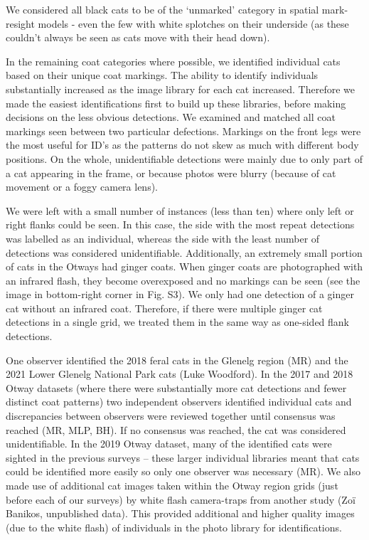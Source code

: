 \documentclass[11pt,a4paper,titlepage,twoside,openright]{style/unimelbthesis}
\begin{document}
\begin{mainmatter}
We considered all black cats to be of the `unmarked' category in spatial mark-resight models - even the few with white splotches on their underside (as these couldn't always be seen as cats move with their head down).

In the remaining coat categories where possible, we identified individual cats based on their unique coat markings. The ability to identify individuals substantially increased as the image library for each cat increased. Therefore we made the easiest identifications first to build up these libraries, before making decisions on the less obvious detections. We examined and matched all coat markings seen between two particular defections. Markings on the front legs were the most useful for ID's as the patterns do not skew as much with different body positions. On the whole, unidentifiable detections were mainly due to only part of a cat appearing in the frame, or because photos were blurry (because of cat movement or a foggy camera lens).

We were left with a small number of instances (less than ten) where only left or right flanks could be seen. In this case, the side with the most repeat detections was labelled as an individual, whereas the side with the least number of detections was considered unidentifiable. Additionally, an extremely small portion of cats in the Otways had ginger coats. When ginger coats are photographed with an infrared flash, they become overexposed and no markings can be seen (see the image in bottom-right corner in Fig. S3). We only had one detection of a ginger cat without an infrared coat. Therefore, if there were multiple ginger cat detections in a single grid, we treated them in the same way as one-sided flank detections.

One observer identified the 2018 feral cats in the Glenelg region (MR) and the 2021 Lower Glenelg National Park cats (Luke Woodford). In the 2017 and 2018 Otway datasets (where there were substantially more cat detections and fewer distinct coat patterns) two independent observers identified individual cats and discrepancies between observers were reviewed together until consensus was reached (MR, MLP, BH). If no consensus was reached, the cat was considered unidentifiable. In the 2019 Otway dataset, many of the identified cats were sighted in the previous surveys -- these larger individual libraries meant that cats could be identified more easily so only one observer was necessary (MR). We also made use of additional cat images taken within the Otway region grids (just before each of our surveys) by white flash camera-traps from another study (Zoï Banikos, unpublished data). This provided additional and higher quality images (due to the white flash) of individuals in the photo library for identifications.


\end{mainmatter}
\end{document}
